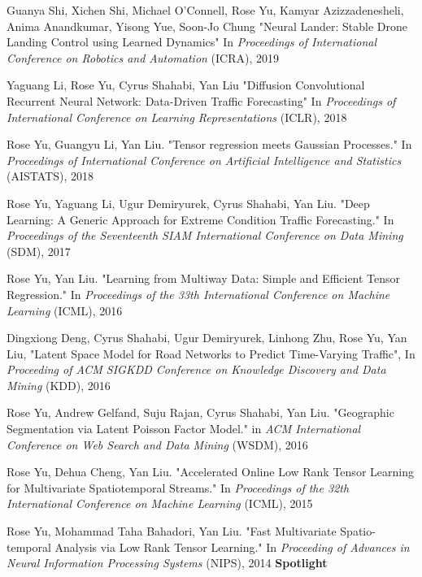\documentclass[margin,line]{res}
\begin{document}
\begin{resume}
\begin{enumerate}[label={[C\arabic*]}]
\item Guanya Shi, Xichen Shi, Michael O'Connell, Rose Yu, Kamyar Azizzadenesheli, Anima Anandkumar, Yisong Yue, Soon-Jo Chung
       "Neural Lander: Stable Drone Landing Control using Learned Dynamics" In \textit{Proceedings  of International Conference on Robotics and Automation} (ICRA), 2019

\item 	Yaguang Li,  Rose Yu, Cyrus Shahabi, Yan Liu
	"Diffusion Convolutional Recurrent Neural Network: Data-Driven Traffic Forecasting" In \textit{Proceedings  of  International Conference on Learning Representations
	}(ICLR), 2018 
	
\item  Rose Yu, Guangyu Li, Yan Liu. "Tensor regression meets Gaussian Processes." In \textit{Proceedings  of  International Conference on Artificial Intelligence and Statistics } (AISTATS), 2018 

\item Rose Yu, Yaguang Li, Ugur Demiryurek, Cyrus Shahabi, Yan Liu. "Deep Learning: A Generic Approach for Extreme Condition Traffic Forecasting." In \textit{Proceedings  of the Seventeenth SIAM International Conference on Data Mining }(SDM), 2017

\item Rose Yu, Yan Liu. "Learning from Multiway Data: Simple and Efficient Tensor Regression." In \textit{Proceedings  of the 33th International Conference on Machine Learning }(ICML),   2016

\item Dingxiong Deng, Cyrus Shahabi, Ugur Demiryurek, Linhong Zhu,  Rose Yu, Yan Liu, 
"Latent Space Model for Road Networks to Predict Time-Varying Traffic", In \textit{Proceeding of ACM SIGKDD Conference on Knowledge Discovery and Data Mining } (KDD), 2016

\item Rose Yu, Andrew Gelfand, Suju Rajan, Cyrus Shahabi, Yan Liu. "Geographic Segmentation via Latent Poisson Factor Model." in \textit{ACM International Conference on Web Search and Data Mining} (WSDM), 2016 

\item Rose Yu, Dehua Cheng, Yan Liu. "Accelerated Online Low Rank Tensor Learning for Multivariate Spatiotemporal Streams." In \textit{Proceedings  of the 32th International Conference on Machine Learning} (ICML), 2015

\item Rose Yu, Mohammad Taha Bahadori, Yan Liu. "Fast Multivariate Spatio-temporal Analysis via Low Rank Tensor Learning." In \textit{Proceeding of Advances in Neural Information Processing Systems} (NIPS), 2014 \textbf{Spotlight}


\end{enumerate}
\end{resume}
\end{document}
